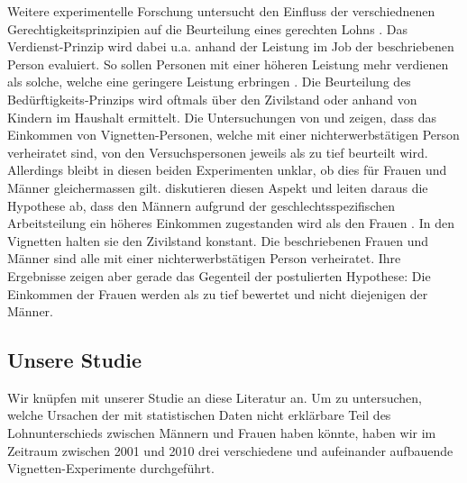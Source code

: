 \documentclass[a4paper,12pt]{article}
\renewcommand{\baselinestretch}{1.1}
\newif\ifcomments
\newcommand{\comment}[1]{%
    \ifcomments\marginpar{\renewcommand{\baselinestretch}{1}\tiny\hspace*{-1.1em}\colorbox{gray!20}%
    {\textcolor{red}{\parbox[t]{.9in}{\raggedright #1}}}}\fi}
\begin{document}
Weitere experimentelle Forschung untersucht den Einfluss der verschiednenen Gerechtigkeitsprinzipien auf die Beurteilung eines gerechten Lohns \citep{Jasso-Rossi-1977}. Das Verdienst-Prinzip wird dabei u.a. anhand der Leistung im Job der beschriebenen Person evaluiert. So sollen Personen mit einer höheren Leistung mehr verdienen als solche, welche eine geringere Leistung erbringen \citep{Auspurg-etal-2017,Gatskova-2015,Jann-2003}. Die Beurteilung des Bedürftigkeits-Prinzips wird oftmals über den Zivilstand oder anhand von Kindern im Haushalt ermittelt. Die Untersuchungen von \citet{Gatskova-2015} und \citet{Sauer-etal-2009} zeigen, dass das Einkommen von Vignetten-Personen, welche mit
einer nichterwerbstätigen Person verheiratet sind, von den Versuchspersonen
jeweils als zu tief beurteilt wird. Allerdings bleibt in diesen beiden
Experimenten unklar, ob dies für Frauen und Männer gleichermassen gilt. 
\citet{Shamon-Duelmer-2014} diskutieren diesen Aspekt und leiten daraus die Hypothese ab,
dass den Männern aufgrund der geschlechtsspezifischen Arbeitsteilung ein
höheres Einkommen zugestanden wird als den Frauen \citep[348]{Shamon-Duelmer-2014}.
In den Vignetten halten sie den Zivilstand
konstant. Die beschriebenen Frauen und Männer sind alle mit einer
nichterwerbstätigen Person verheiratet. Ihre Ergebnisse zeigen aber gerade das
Gegenteil der postulierten Hypothese: Die Einkommen der Frauen werden als zu
tief bewertet und nicht diejenigen der Männer. \comment{Da könnte auch ein
„Kompensations-Effekt“ eine Rolle spielen, denn dass in verheirateten Paaren
nur die Frau erwerbstätig ist, ist ungewöhnlich und hat vermutlich meist
gewichtige Gründe (z.B. Arbeitslosigkeit oder Krankheit des Mannes).}

\subsection{Unsere Studie}
\label{sec:ss5}

Wir knüpfen mit unserer Studie an diese Literatur an. Um zu untersuchen, welche
Ursachen der mit statistischen Daten nicht erklärbare Teil des Lohnunterschieds
zwischen Männern und Frauen haben könnte, haben wir im Zeitraum zwischen 2001
und 2010 drei verschiedene und aufeinander aufbauende Vignetten-Experimente
durchgeführt. 
\comment{hier z.b. auf Auspurg et al. 2017 aufbauen -> habe ich jetzt weiter oben gemacht...}
\end{document}
